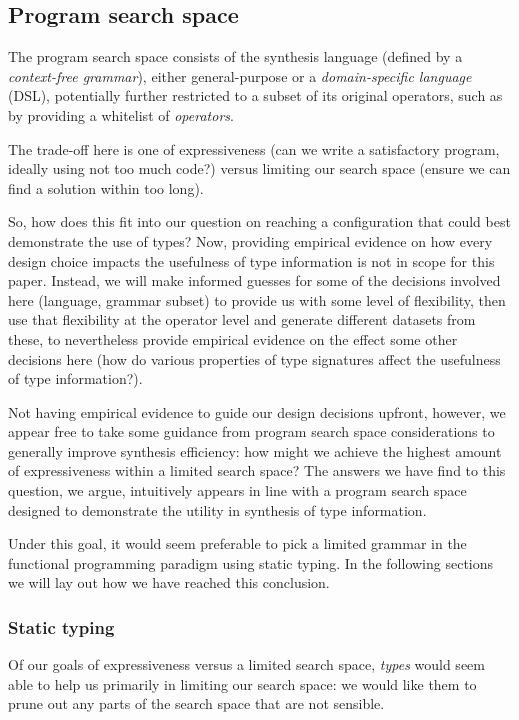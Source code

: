 \documentclass{article}
\begin{document}
\subsection{Program search space}

The program search space consists of the synthesis language (defined by a \emph{context-free grammar}),
either general-purpose or a \emph{domain-specific language} (DSL),
potentially further restricted to a subset of its original operators,
such as by providing a whitelist of \emph{operators}.

The trade-off here is one of expressiveness (can we write a satisfactory program, ideally using not too much code?) versus limiting our search space (ensure we can find a solution within too long).

So, how does this fit into our question on reaching a configuration that could best demonstrate the use of types?
Now, providing empirical evidence on how every design choice impacts the usefulness of type information is not in scope for this paper.
Instead, we will make informed guesses for some of the decisions involved here (language, grammar subset) to provide us with some level of flexibility,
then use that flexibility at the operator level and generate different datasets from these, to nevertheless provide empirical evidence on the effect some other decisions here (how do various properties of type signatures affect the usefulness of type information?).

Not having empirical evidence to guide our design decisions upfront, however,
we appear free to take some guidance from program search space considerations to generally improve synthesis efficiency:
how might we achieve the highest amount of expressiveness within a limited search space?
The answers we have find to this question, we argue,
intuitively appears in line with a program search space designed to demonstrate the utility in synthesis of type information.

Under this goal, it would seem preferable to pick a limited grammar in the functional programming paradigm using static typing.
In the following sections we will lay out how we have reached this conclusion.

\subsubsection{Static typing}

Of our goals of expressiveness versus a limited search space,
\emph{types} would seem able to help us primarily in limiting our search space:
we would like them to prune out any parts of the search space that are not sensible.
\end{document}
